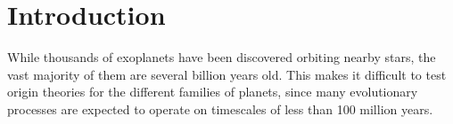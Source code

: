 \documentclass[12pt,modern,twocolumn,tighten]{aastex63}
\begin{document}




\section{Introduction}

While thousands of exoplanets have been discovered orbiting nearby
stars, the vast majority of them are several billion years old.  This
makes it difficult to test origin theories for the different
families of planets, since many evolutionary processes are expected to
operate on timescales of less than 100 million years.
\end{document}
